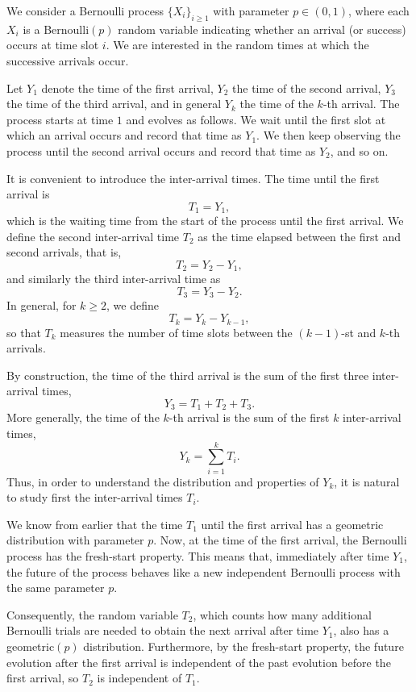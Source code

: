 We consider a Bernoulli process \(\{X_i\}_{i \geq 1}\) with parameter \(p \in (0,1)\), where each \(X_i\) is a Bernoulli\((p)\) random variable indicating whether an arrival (or success) occurs at time slot \(i\).  
We are interested in the random times at which the successive arrivals occur.  

Let \(Y_1\) denote the time of the first arrival, \(Y_2\) the time of the second arrival, \(Y_3\) the time of the third arrival, and in general \(Y_k\) the time of the \(k\)-th arrival.  
The process starts at time \(1\) and evolves as follows.  
We wait until the first slot at which an arrival occurs and record that time as \(Y_1\).  
We then keep observing the process until the second arrival occurs and record that time as \(Y_2\), and so on.  

It is convenient to introduce the inter-arrival times.  
The time until the first arrival is
\[
T_1 = Y_1,
\]
which is the waiting time from the start of the process until the first arrival.  
We define the second inter-arrival time \(T_2\) as the time elapsed between the first and second arrivals, that is,
\[
T_2 = Y_2 - Y_1,
\]
and similarly the third inter-arrival time as
\[
T_3 = Y_3 - Y_2.
\]
In general, for \(k \geq 2\), we define
\[
T_k = Y_k - Y_{k-1},
\]
so that \(T_k\) measures the number of time slots between the \((k-1)\)-st and \(k\)-th arrivals.  

By construction, the time of the third arrival is the sum of the first three inter-arrival times,
\[
Y_3 = T_1 + T_2 + T_3.
\]
More generally, the time of the \(k\)-th arrival is the sum of the first \(k\) inter-arrival times,
\[
Y_k = \sum_{i=1}^{k} T_i.
\]
Thus, in order to understand the distribution and properties of \(Y_k\), it is natural to study first the inter-arrival times \(T_i\).  

We know from earlier that the time \(T_1\) until the first arrival has a geometric distribution with parameter \(p\).  
Now, at the time of the first arrival, the Bernoulli process has the fresh-start property.  
This means that, immediately after time \(Y_1\), the future of the process behaves like a new independent Bernoulli process with the same parameter \(p\).  

Consequently, the random variable \(T_2\), which counts how many additional Bernoulli trials are needed to obtain the next arrival after time \(Y_1\), also has a geometric\((p)\) distribution.  
Furthermore, by the fresh-start property, the future evolution after the first arrival is independent of the past evolution before the first arrival, so \(T_2\) is independent of \(T_1\).  

